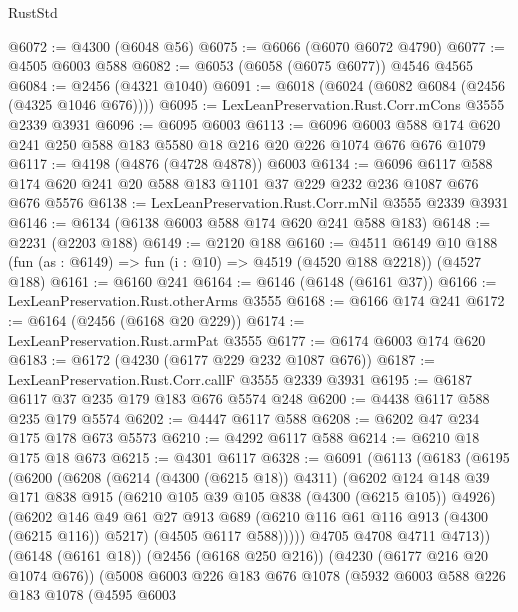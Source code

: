 \begin{lexlean}{RustStd}
\begin{coremodule}
@6072 := @4300 (@6048 @56)
@6075 := @6066 (@6070 @6072 @4790)
@6077 := @4505 @6003 @588
@6082 := @6053 (@6058 (@6075 @6077)) @4546 @4565
@6084 := @2456 (@4321 @1040)
@6091 := @6018 (@6024 (@6082 @6084 (@2456 (@4325 @1046 @676))))
@6095 := LexLeanPreservation.Rust.Corr.mCons @3555 @2339 @3931
@6096 := @6095 @6003
@6113 := @6096
    @6003
    @588
    @174
    @620
    @241
    @250
    @588
    @183
    @5580
    @18
    @216
    @20
    @226
    @1074
    @676
    @676
    @1079
@6117 := @4198 (@4876 (@4728 @4878)) @6003
@6134 := @6096
    @6117
    @588
    @174
    @620
    @241
    @20
    @588
    @183
    @1101
    @37
    @229
    @232
    @236
    @1087
    @676
    @676
    @5576
@6138 := LexLeanPreservation.Rust.Corr.mNil @3555 @2339 @3931
@6146 := @6134 (@6138 @6003 @588 @174 @620 @241 @588 @183)
@6148 := @2231 (@2203 @188)
@6149 := @2120 @188
@6160 := @4511
    @6149
    @10
    @188
    (fun (as : @6149) => fun (i : @10) => @4519 (@4520 @188 @2218))
    (@4527 @188)
@6161 := @6160 @241
@6164 := @6146 (@6148 (@6161 @37))
@6166 := LexLeanPreservation.Rust.otherArms @3555
@6168 := @6166 @174 @241
@6172 := @6164 (@2456 (@6168 @20 @229))
@6174 := LexLeanPreservation.Rust.armPat @3555
@6177 := @6174 @6003 @174 @620
@6183 := @6172 (@4230 (@6177 @229 @232 @1087 @676))
@6187 := LexLeanPreservation.Rust.Corr.callF @3555 @2339 @3931
@6195 := @6187 @6117 @37 @235 @179 @183 @676 @5574 @248
@6200 := @4438 @6117 @588 @235 @179 @5574
@6202 := @4447 @6117 @588
@6208 := @6202 @47 @234 @175 @178 @673 @5573
@6210 := @4292 @6117 @588
@6214 := @6210 @18 @175 @18 @673
@6215 := @4301 @6117
@6328 := @6091
    (@6113
      (@6183
        (@6195
          (@6200
            (@6208
              (@6214 (@4300 (@6215 @18)) @4311)
              (@6202
                @124
                @148
                @39
                @171
                @838
                @915
                (@6210 @105 @39 @105 @838 (@4300 (@6215 @105)) @4926)
                (@6202
                  @146
                  @49
                  @61
                  @27
                  @913
                  @689
                  (@6210 @116 @61 @116 @913 (@4300 (@6215 @116)) @5217)
                  (@4505 @6117 @588)))))
          @4705
          @4708
          @4711
          @4713))
      (@6148 (@6161 @18))
      (@2456 (@6168 @250 @216))
      (@4230 (@6177 @216 @20 @1074 @676))
      (@5008
        @6003
        @226
        @183
        @676
        @1078
        (@5932
          @6003
          @588
          @226
          @183
          @1078
          (@4595
            @6003

\end{coremodule}
\end{lexlean}
